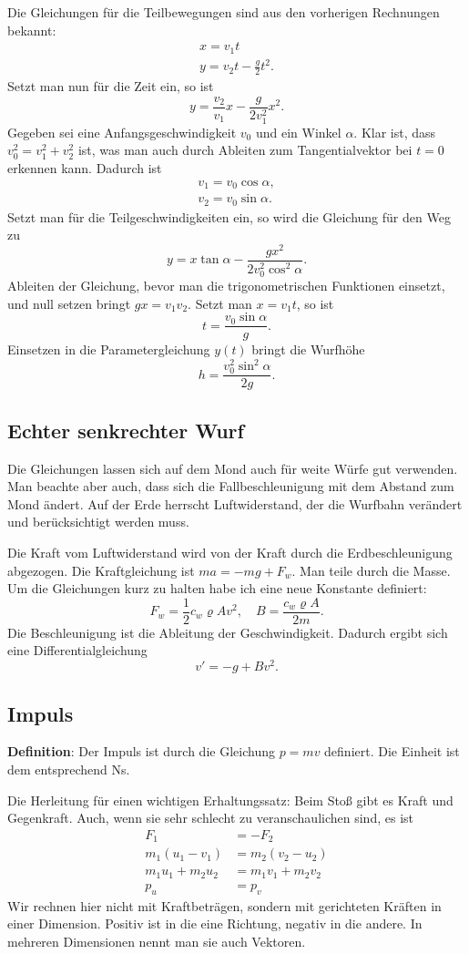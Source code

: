\documentclass[a4paper,10pt,fleqn,twocolumn,twoside]{article}
\begin{document}
Die Gleichungen für die Teilbewegungen sind aus den vorherigen
Rechnungen bekannt:
\begin{gather*}
x = v_1t\\
y = v_2t - \frac{g}{2}t^2.
\end{gather*}
Setzt man nun für die Zeit ein, so ist
\[y = \frac{v_2}{v_1}x - \frac{g}{2v_1^2} x^2.\]
Gegeben sei eine Anfangsgeschwindigkeit $v_0$ und ein
Winkel $\alpha$. Klar ist, dass $v_0^2=v_1^2+v_2^2$ ist,
was man auch durch Ableiten zum Tangentialvektor bei $t=0$
erkennen kann. Dadurch ist
\begin{gather*}
v_1 = v_0\cos\alpha,\\
v_2 = v_0\sin\alpha.
\end{gather*}
Setzt man für die Teilgeschwindigkeiten ein, so wird die Gleichung
für den Weg zu
\[y = x\tan\alpha - \frac{gx^2}{2v_0^2\cos^2\alpha}.\]
Ableiten der Gleichung, bevor man die trigonometrischen Funktionen
einsetzt, und null setzen bringt $gx = v_1v_2$.
Setzt man $x=v_1t$, so ist
\[t = \frac{v_0\sin\alpha}{g}.\]
Einsetzen in die Parametergleichung $y(t)$ bringt die Wurfhöhe
\[h = \frac{v_0^2\sin^2\alpha}{2g}.\]

\subsection{Echter senkrechter Wurf}

Die Gleichungen lassen sich auf dem Mond auch für weite Würfe gut
verwenden. Man beachte aber auch, dass sich die Fall{}beschleunigung
mit dem Abstand zum Mond ändert. Auf der Erde herrscht Luftwiderstand,
der die Wurfbahn verändert und berücksichtigt werden muss.

Die Kraft vom Luftwiderstand wird von der Kraft durch die
Erdbeschleunigung abgezogen. Die Kraftgleichung ist $ma = -mg + F_w$.
Man teile durch die Masse. Um die Gleichungen kurz zu halten habe
ich eine neue Konstante definiert:
\[F_w = \frac{1}{2}c_w\varrho Av^2,\quad B = \frac{c_w\varrho A}{2m}.\]
Die Beschleunigung ist die Ableitung der Geschwindigkeit.
Dadurch ergibt sich eine Differentialgleichung
\[v' = -g + Bv^2.\]

\subsection{Impuls}

\textbf{Definition}: Der Impuls ist durch die Gleichung $p=mv$
definiert. Die Einheit ist dem entsprechend Ns.

Die Herleitung für einen wichtigen Erhaltungssatz: Beim Stoß gibt es
Kraft und Gegenkraft. Auch, wenn sie sehr schlecht zu
veranschaulichen sind, es ist
\begin{align*}
F_1 &= -F_2\\
m_1(u_1-v_1) &= m_2(v_2-u_2)\\
m_1u_1+m_2u_2 &= m_1v_1+m_2v_2\\
p_u &= p_v
\end{align*}
Wir rechnen hier nicht mit Kraftbeträgen, sondern mit
gerichteten Kräften in einer Dimension. Positiv ist in die
eine Richtung, negativ in die andere. In mehreren Dimensionen nennt
man sie auch Vektoren.
\end{document}
